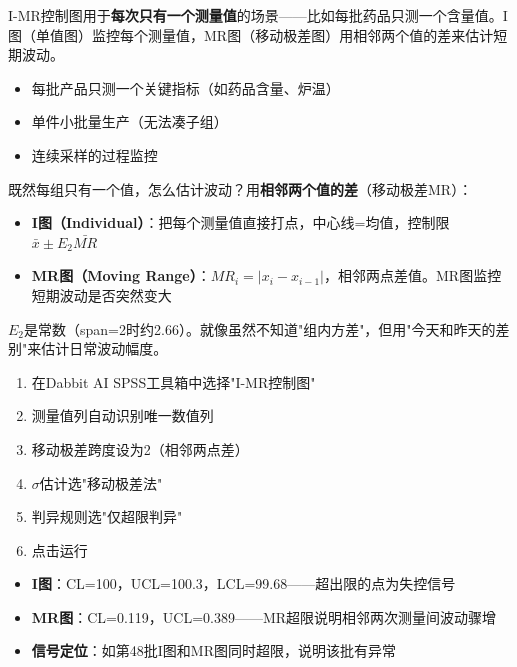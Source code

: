
\begin{algointro}
I-MR控制图用于\textbf{每次只有一个测量值}的场景——比如每批药品只测一个含量值。I图（单值图）监控每个测量值，MR图（移动极差图）用相邻两个值的差来估计短期波动。
\end{algointro}

\begin{algoscene}
\begin{itemize}
    \item 每批产品只测一个关键指标（如药品含量、炉温）
    \item 单件小批量生产（无法凑子组）
    \item 连续采样的过程监控
\end{itemize}
\end{algoscene}

\begin{algoprinciple}
既然每组只有一个值，怎么估计波动？用\textbf{相邻两个值的差}（移动极差MR）：

\begin{itemize}
    \item \textbf{I图（Individual）}：把每个测量值直接打点，中心线=均值，控制限$\bar{x}\pm E_2\bar{MR}$
    \item \textbf{MR图（Moving Range）}：$MR_i = |x_i - x_{i-1}|$，相邻两点差值。MR图监控短期波动是否突然变大
\end{itemize}

$E_2$是常数（span=2时约2.66）。就像虽然不知道"组内方差"，但用"今天和昨天的差别"来估计日常波动幅度。
\end{algoprinciple}

\begin{algosposs}
\begin{enumerate}
    \item 在Dabbit AI SPSS工具箱中选择"I-MR控制图"
    \item 测量值列自动识别唯一数值列
    \item 移动极差跨度设为2（相邻两点差）
    \item $\sigma$估计选"移动极差法"
    \item 判异规则选"仅超限判异"
    \item 点击运行
\end{enumerate}
\end{algosposs}

\begin{algoresult}
\begin{itemize}
    \item \textbf{I图}：CL=100，UCL=100.3，LCL=99.68——超出限的点为失控信号
    \item \textbf{MR图}：CL=0.119，UCL=0.389——MR超限说明相邻两次测量间波动骤增
    \item \textbf{信号定位}：如第48批I图和MR图同时超限，说明该批有异常
\end{itemize}
\end{algoresult}

